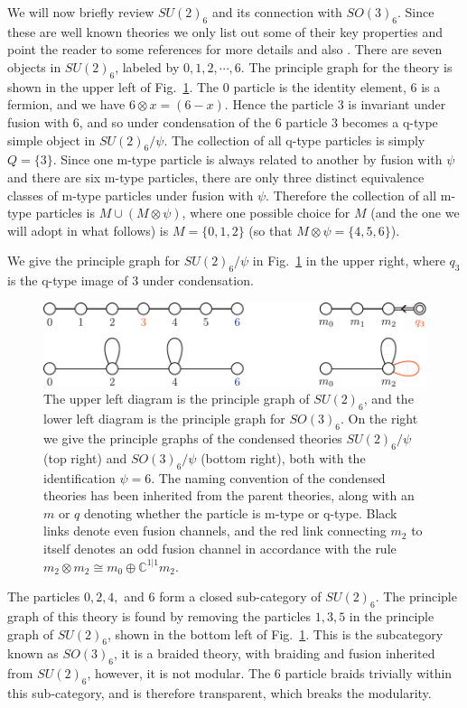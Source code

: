\documentclass[12pt,a4paper]{article}
\newcommand{\tp}{\otimes}
\newcommand{\cc}{\mathbb{C}}
\begin{document}
We will now briefly review $SU(2)_6$ and its connection with $SO(3)_6$.
Since these are well known theories we only list out some of their key properties and point the 
reader to some references for more details \cite{kirillow1989} and also \cite{Bonderson2007}.
There are seven objects in $SU(2)_6$, labeled by $0,1,2,\cdots, 6$.
The principle graph for the theory is shown in the upper left of Fig.~\ref{SUSOsix}. 
The $0$ particle is the identity element, $6$ is a fermion, and we have $6 \tp x = (6-x)$. 
Hence the particle $3$ is invariant under fusion with $6$, and so under condensation of the $6$ 
particle $3$ becomes a q-type simple object in $SU(2)_6/\psi$.
The collection of all q-type particles is simply $Q=\{3\}$. 
Since one m-type particle is always related to another by fusion with $\psi$ and 
there are six m-type particles, there are only three distinct equivalence classes of m-type
particles under fusion with $\psi$. Therefore the collection of all m-type particles is
$M\cup (M\tp \psi)$, where one possible choice for $M$ (and the one
we will adopt in what follows) is $M=\{0,1,2\}$ (so that $M\tp \psi = \{4,5,6\}$). 

We give the principle graph for $SU(2)_6/\psi$ in Fig.~\ref{SUSOsix} in the upper right, where $q_3$ is the q-type image of $3$ under condensation.
\begin{figure} 
\centering
\includegraphics{SU26SO36Dynkin.pdf}
\caption{\label{SUSOsix} The upper left diagram is the principle graph of $SU(2)_6$, and the 
lower left diagram is the principle graph for $SO(3)_6$. 
On the right we give the principle graphs of the condensed theories $SU(2)_6/\psi$ (top right) and 
$SO(3)_6/\psi$ (bottom right), both with the identification $\psi=6$. 
The naming convention of the condensed theories has been inherited from the parent theories, 
along with an $m$ or $q$ denoting whether the particle is m-type or q-type.
Black links denote even fusion channels, and the red link connecting $m_2$ to itself 
denotes an odd fusion channel in accordance with the rule $m_2\tp m_2 \cong m_0 \oplus \cc^{1|1}m_2$. 
}
\end{figure}
The particles $0,2,4,$ and $6$ form a closed sub-category of $SU(2)_6$. 
The principle graph of this theory is found by removing the particles $1,3,5$ in the principle graph of $SU(2)_6$, shown in the bottom left of Fig.~\ref{SUSOsix}. 
This is the subcategory known as $SO(3)_6$, it is a braided theory, with braiding and fusion inherited from $SU(2)_6$, however, it is not modular.
The $6$ particle braids trivially within this sub-category, and is therefore transparent, which breaks the modularity.
\end{document}
